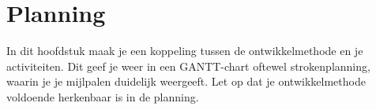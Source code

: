 \chapter{Planning}
In dit hoofdstuk maak je een koppeling tussen de ontwikkelmethode en je activiteiten. Dit geef je weer in een GANTT-chart oftewel strokenplanning, waarin je je mijlpalen duidelijk weergeeft. Let op dat je ontwikkelmethode voldoende herkenbaar is in de planning.